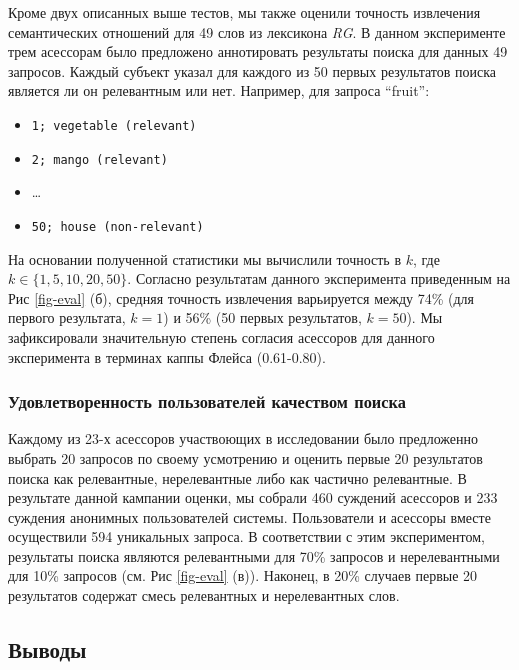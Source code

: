 \documentclass[a4paper,10pt,twoside]{article}
\begin{document}
Кроме двух описанных выше тестов, мы также оценили точность извлечения семантических отношений для 49 слов из лексикона \textit{RG}. В данном эксперименте трем асессорам было предложено аннотировать результаты поиска для данных 49 запросов. Каждый субъект указал для каждого из 50 первых результатов поиска является ли он релевантным или нет. Например, для запроса ``fruit'':

\begin{itemize}
  \footnotesize
  \item \texttt{1; vegetable (relevant)}
  \item \texttt{2; mango (relevant)}
  \item \ldots
  \item \texttt{50; house (non-relevant)}
\end{itemize} 

На основании полученной статистики мы вычислили точность в $k$, где $k \in \{1, 5, 10, 20, 50\}$. Согласно результатам данного эксперимента приведенным на Рис \ref{fig-eval} (б), средняя точность извлечения варьируется между 74\% (для первого результата, $k=1$) и 56\% (50 первых результатов, $k=50$). Мы зафиксировали значительную степень согласия асессоров для данного эксперимента в терминах каппы Флейса (0.61-0.80).


\subsubsection{Удовлетворенность пользователей качеством поиска} Каждому из 23-х асессоров участвоющих в исследовании было предложенно выбрать 20 запросов по своему усмотрению и оценить первые 20 результатов поиска как релевантные, нерелевантные либо как частично релевантные. В результате данной кампании оценки, мы собрали 460 суждений асессоров и 233 суждения анонимных пользователей системы. Пользователи и асессоры вместе осуществили 594 уникальных запроса. В соответствии с этим экспериментом, результаты поиска являются релевантными для 70\% запросов и нерелевантными для 10\% запросов (см. Рис \ref{fig-eval} (в)). Наконец, в 20\% случаев первые 20 результатов содержат смесь релевантных и нерелевантных слов.

\subsection{Выводы}
\end{document}
